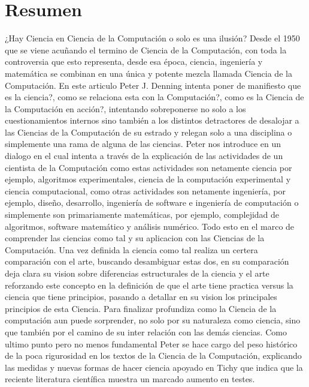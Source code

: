 \documentclass[12pt,letterpaper]{article}
\begin{document}
\section*{\centering Resumen}
¿Hay Ciencia en Ciencia de la Computación o solo es una ilusión? Desde el 1950 que se viene acuñando el termino de Ciencia de la Computación, con toda la controversia que esto representa, desde esa época, ciencia, ingeniería y matemática se combinan en una única y potente mezcla llamada Ciencia de la Computación. En este articulo Peter J. Denning\autocite{Peter2005} intenta poner de manifiesto que es la ciencia?, como se relaciona esta con la Computación?, como es la Ciencia de la Computación en acción?, intentando sobreponerse no solo a los cuestionamientos internos sino también a los distintos detractores de desalojar a las Ciencias de la Computación de su estrado y relegan solo a una disciplina o simplemente una rama de alguna de las ciencias\autocite{ciencia}. Peter nos introduce en un dialogo en el cual intenta a través de la explicación de las actividades de un cientista\autocite{Cientista} de la Computación como estas actividades son netamente ciencia por ejemplo, algoritmos experimentales,
ciencia de la computación experimental y ciencia computacional, como otras actividades son netamente ingeniería, por ejemplo, diseño, desarrollo, ingeniería de software e ingeniería de computación o simplemente son primariamente matemáticas, por ejemplo, complejidad de algoritmos, software
matemático y análisis numérico. Todo esto en el marco de comprender las ciencias como tal y su aplicacion con las Ciencias de la Computación. Una vez definida la ciencia como tal realiza un certera comparación con el arte, buscando desambiguar estas dos, en su comparación deja clara su vision sobre diferencias estructurales de la ciencia y el arte reforzando este concepto en la definición de que el arte tiene practica versus la ciencia que tiene principios, pasando a detallar en su vision los principales principios de esta Ciencia. Para finalizar profundiza como la Ciencia de la computación aun puede sorprender, no solo por su naturaleza como ciencia, sino que también por el camino de su inter relación con las demás ciencias. Como ultimo punto pero no menos fundamental Peter se hace cargo del peso histórico de la poca rigurosidad en los textos de la Ciencia de la Computación, explicando las medidas y nuevas formas de hacer ciencia apoyado en Tichy\autocite{Peter2005} que indica que la reciente literatura científica muestra un marcado aumento en testes.
\end{document}
